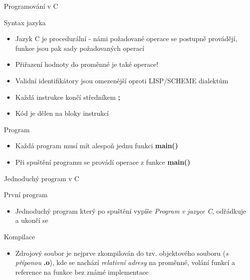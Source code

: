 \documentclass[9pt]{beamer}
\begin{document}
\begin{frame}{Programování v C}

    \begin{block}{Syntax jazyka}
    \begin{itemize}
        \item Jazyk C je procedurální - námi požadované operace se postupně provádějí, funkce jsou pak sady požadovaných operací
        \item Přiřazení hodnoty do proměnné je také operace!
        \item Validní identifikátory jsou omezenější oproti LISP/SCHEME dialektům
        \item Každá instrukce končí středníkem \textbf{;}
        \item Kód je dělen na bloky instrukcí
    \end{itemize}
    \end{block}
    
    \pause
    
    \begin{block}{Program}
        \begin{itemize}
            \item Každá program musí mít alespoň jednu funkci \textbf{main()}
            \item Při spuštění programu se provádí operace z funkce \textbf{main()}
        \end{itemize}
    \end{block}
\end{frame}

\begin{frame}{Jednoduchý program v C}

\begin{block}{První program}
\begin{itemize}
    \item Jednoduchý program který po spuštění vypíše \textit{Program v jazyce C}, odřádkuje a ukončí se
\end{itemize}
\end{block}

\pause



\pause

\begin{block}{Kompilace}
    \begin{itemize}
        \item Zdrojový soubor je nejprve zkompilován do tzv. objektového souboru (\textit{s příponou} \textbf{.o}), kde se nachází \textit{relativní adresy} na proměnné, volání funkcí a reference na funkce bez známé implementace\
    \end{itemize}
\end{block} 
\end{frame}
\end{document}
